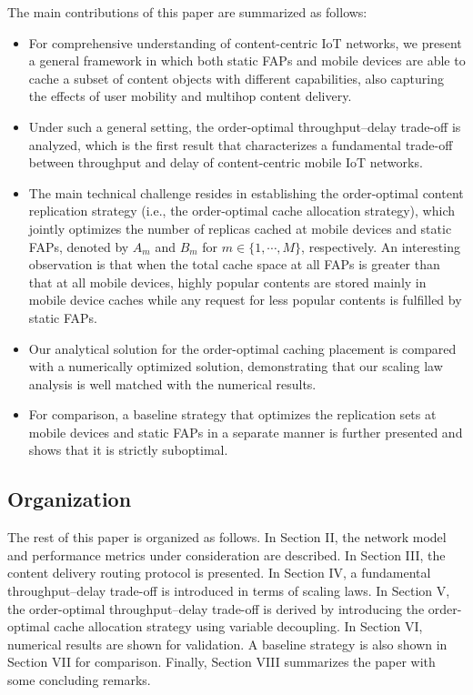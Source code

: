 \documentclass[10pt,journal,compsoc,onecolumn]{IEEEtran}
\begin{document}
The main contributions of this paper are summarized
as follows:
\begin{itemize}
\item For comprehensive understanding of content-centric IoT networks, we present a general framework in which both static FAPs and mobile devices are able to cache a subset of content objects with different capabilities, also capturing the effects of user mobility and multihop content delivery. 

\item Under such a general setting, the order-optimal  throughput--delay trade-off is analyzed, which is the first result that characterizes a fundamental trade-off between throughput and delay of content-centric mobile IoT networks.

\item The main technical challenge resides in establishing the order-optimal content
replication strategy (i.e., the order-optimal cache allocation
strategy), which jointly optimizes the number of replicas cached
at mobile devices and static FAPs, denoted by $A_m$ and $B_m$ for
$m\in\{1,\cdots,M\}$, respectively. An interesting observation is that when the total cache
space at all FAPs is greater than that at all mobile devices, highly
popular contents are stored mainly in mobile device caches while any
request for less popular contents is fulfilled by static FAPs.


\item Our analytical solution for the order-optimal caching placement is compared with a numerically optimized solution, demonstrating that our  scaling law analysis is well matched with the numerical results.

\item For comparison, a baseline strategy that
optimizes the replication sets at mobile devices and static FAPs in a
separate manner is further presented and shows that it is strictly suboptimal.
\end{itemize}



\subsection{Organization}
The rest of this paper is organized as follows. In Section II, the
network model and performance metrics under consideration are
described. In Section III, the content delivery routing protocol
is presented. In Section IV, a fundamental throughput--delay
trade-off is introduced in terms of scaling laws. In Section V,
the order-optimal throughput--delay trade-off is derived by introducing
the order-optimal cache allocation strategy using variable decoupling. In Section VI, numerical results are shown for validation. A
baseline strategy is also shown in Section VII for comparison.
Finally, Section VIII summarizes the paper with some concluding
remarks.
\end{document}
